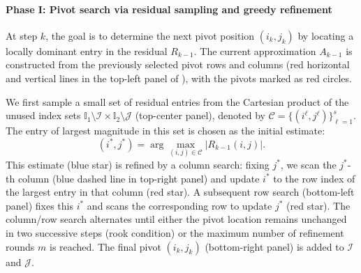 \documentclass{article}
\theoremstyle{plain}
\theoremstyle{definition}
\theoremstyle{remark}
\begin{document}
\paragraph{Phase I: Pivot search via residual sampling and greedy refinement}
At step \( k \), the goal is to determine the next pivot position \( (i_k, j_k) \) by locating a locally dominant entry in the residual \(R_{k-1}\). The current approximation \(A_{k-1}\) is constructed from the previously selected pivot rows and columns (red horizontal and vertical lines in the top-left panel of ), with the pivots marked as red circles.

We first sample a small set of residual entries from the Cartesian product of the unused index sets $\mathbb{I}_1\setminus\mathcal{I}\times\mathbb{I}_2\setminus\mathcal{J}$ (top-center panel), denoted by \(\mathcal{C} = \{(i^\ell, j^\ell)\}_{\ell=1}^s\). The entry of largest magnitude in this set is chosen as the initial estimate:
\[
(i^\ast, j^\ast) = \arg\max_{(i,j) \in \mathcal{C}} |R_{k-1}(i,j)|.
\]
This estimate (blue star) is refined by a column search: fixing \(j^\ast\), we scan the \(j^\ast\)-th column (blue dashed line in top-right panel) and update \(i^\ast\) to the row index of the largest entry in that column (red star). A subsequent row search (bottom-left panel) fixes this \(i^\ast\) and scans the corresponding row to update \(j^\ast\) (red star). The column/row search alternates until either the pivot location remains unchanged in two successive steps (rook condition) or the maximum number of refinement rounds \(m\) is reached. The final pivot \((i_k, j_k)\) (bottom-right panel) is added to \(\mathcal{I}\) and \(\mathcal{J}\).
\end{document}
